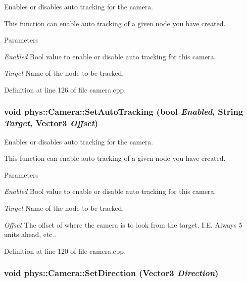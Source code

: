 Enables or disables auto tracking for the camera. 

This function can enable auto tracking of a given node you have created. 
\begin{DoxyParams}{Parameters}
\item[{\em Enabled}]Bool value to enable or disable auto tracking for this camera. \item[{\em Target}]Name of the node to be tracked. \end{DoxyParams}


Definition at line 126 of file camera.cpp.

\hypertarget{classphys_1_1Camera_ad49538281af9940dca156113cf006137}{
\subsubsection[{SetAutoTracking}]{\setlength{\rightskip}{0pt plus 5cm}void phys::Camera::SetAutoTracking (bool {\em Enabled}, \/  {\bf String} {\em Target}, \/  {\bf Vector3} {\em Offset})}}
\label{d9/df8/classphys_1_1Camera_ad49538281af9940dca156113cf006137}


Enables or disables auto tracking for the camera. 

This function can enable auto tracking of a given node you have created. 
\begin{DoxyParams}{Parameters}
\item[{\em Enabled}]Bool value to enable or disable auto tracking for this camera. \item[{\em Target}]Name of the node to be tracked. \item[{\em Offset}]The offset of where the camera is to look from the target. I.E. Always 5 units ahead, etc.. \end{DoxyParams}


Definition at line 120 of file camera.cpp.

\hypertarget{classphys_1_1Camera_a50746cdd4f7d483edffe87d24d2b4bc6}{
\subsubsection[{SetDirection}]{\setlength{\rightskip}{0pt plus 5cm}void phys::Camera::SetDirection ({\bf Vector3} {\em Direction})}}
\label{d9/df8/classphys_1_1Camera_a50746cdd4f7d483edffe87d24d2b4bc6}



